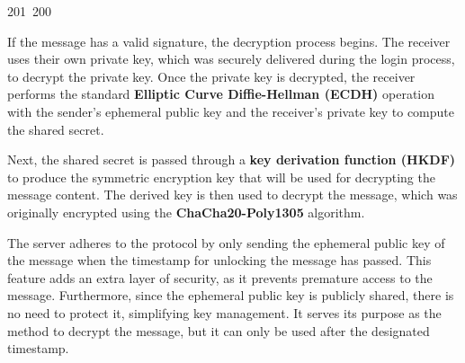 201~200~\documentclass{article}
\begin{document}
	                                                                                                                                                                                                                                                                                                	                                                                                                If the message has a valid signature, the decryption process begins. The receiver uses their own private key, which was securely delivered during the login process, to decrypt the private key. Once the private key is decrypted, the receiver performs the standard \textbf{Elliptic Curve Diffie-Hellman (ECDH)} operation with the sender's ephemeral public key and the receiver's private key to compute the shared secret.

	                                                                                                                                                                                                                                                                                                	                                                                                                Next, the shared secret is passed through a \textbf{key derivation function (HKDF)} to produce the symmetric encryption key that will be used for decrypting the message content. The derived key is then used to decrypt the message, which was originally encrypted using the \textbf{ChaCha20-Poly1305} algorithm.

	                                                                                                                                                                                                                                                                                                	                                                                                                The server adheres to the protocol by only sending the ephemeral public key of the message when the timestamp for unlocking the message has passed. This feature adds an extra layer of security, as it prevents premature access to the message. Furthermore, since the ephemeral public key is publicly shared, there is no need to protect it, simplifying key management. It serves its purpose as the method to decrypt the message, but it can only be used after the designated timestamp.
\end{document}
